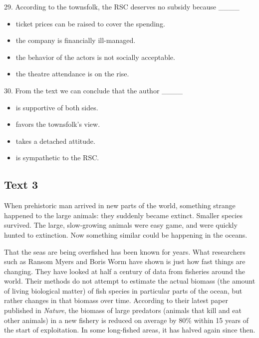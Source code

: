 \documentclass[UTF8,11pt]{ctexart}
\begin{document}
29. According to the townsfolk, the RSC deserves no subsidy because \_\_\_\_


\begin{itemize}[leftmargin=2em,itemsep=.2em,topsep=.4em]\item[A.] ticket prices can be raised to cover the spending.
\item[B.] the company is financially ill-managed.
\item[C.] the behavior of the actors is not socially acceptable.
\item[D.] the theatre attendance is on the rise.
\end{itemize}

30. From the text we can conclude that the author \_\_\_\_


\begin{itemize}[leftmargin=2em,itemsep=.2em,topsep=.4em]\item[A.] is supportive of both sides.
\item[B.] favors the townsfolk’s view.
\item[C.] takes a detached attitude.
\item[D.] is sympathetic to the RSC.
\end{itemize}

\subsection*{\textbf{Text 3}}


When prehistoric man arrived in new parts of the world, something strange happened to the large animals: they suddenly became extinct. Smaller species survived. The large, slow-growing animals were easy game, and were quickly hunted to extinction. Now something similar could be happening in the oceans.


That the seas are being overfished has been known for years. What researchers such as Ransom Myers and Boris Worm have shown is just how fast things are changing. They have looked at half a century of data from fisheries around the world. Their methods do not attempt to estimate the actual biomass (the amount of living biological matter) of fish species in particular parts of the ocean, but rather changes in that biomass over time. According to their latest paper published in \textit{Nature}, the biomass of large predators (animals that kill and eat other animals) in a new fishery is reduced on average by 80\% within 15 years of the start of exploitation. In some long-fished areas, it has halved again since then.
\end{document}

